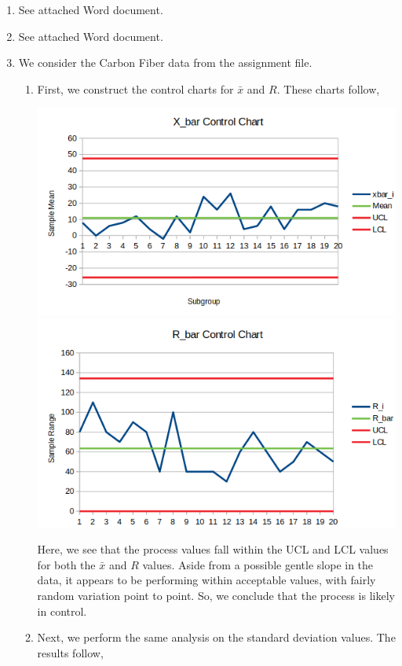 \documentclass[letterpaper,10pt]{article}
\begin{document}
\begin{enumerate}
\item See attached Word document.
\item See attached Word document.
\item We consider the Carbon Fiber data from the assignment file.
\begin{enumerate}
\item First, we construct the control charts for $\bar{x}$ and $R$. These charts follow,
\begin{center}
\includegraphics[scale=.75]{3xbarr.png}
\includegraphics[scale=.75]{3rbar.png}
\end{center}
Here, we see that the process values fall within the UCL and LCL values for both the $\bar{x}$ and $R$ values. Aside from a possible gentle slope in the data, it appears to be performing within acceptable values, with fairly random variation point to point. So, we conclude that the process is likely in control.
\item Next, we perform the same analysis on the standard deviation values. The results follow,

\end{enumerate}
\end{enumerate}
\end{document}
